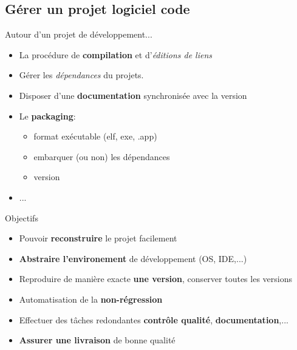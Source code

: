 \documentclass[handout]{beamer}
\begin{document}
\subsection{Gérer un projet logiciel code}
\begin{frame}
	\begin{block}{Autour d'un projet de développement...}
		\begin{itemize}
 			\item La procédure de \textbf{compilation} et d'\textit{éditions de liens}
			\item Gérer les \textit{dépendances} du projets.
			\item Disposer d'une \textbf{documentation} synchronisée avec la version
			\item Le \textbf{packaging}:
			\begin{itemize}
				\item format exécutable (elf, exe, .app)
				\item embarquer (ou non) les dépendances
				\item version
			\end{itemize}	
			\item ...
		\end{itemize}
	\end{block}
\end{frame}
\begin{frame}
	\begin{block}{Objectifs}
		\begin{itemize}
 			\item Pouvoir \textbf{reconstruire} le projet facilement
			\item \textbf{Abstraire l'environement} de développement (OS, IDE,...)
			\item Reproduire de manière exacte \textbf{une version}, conserver toutes les versions
			\item Automatisation de la \textbf{non-régression}
			\item Effectuer des tâches redondantes \textbf{contrôle qualité}, \textbf{documentation},...
			\item \textbf{Assurer une livraison} de bonne qualité
		\end{itemize}
	\end{block}	
\end{frame}
\end{document}
